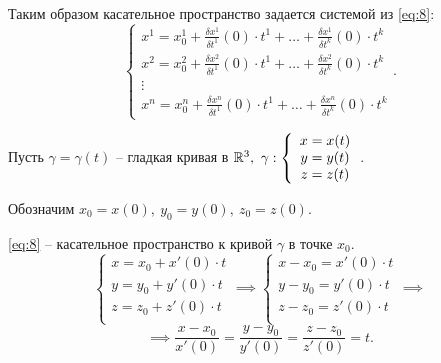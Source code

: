 \begin{definition}
    Таким образом касательное пространство задается системой из \ref{eq:8}:
    \[
        \left\{\begin{array}{l}
            x^1 = x^1_0 + \frac{\delta x^1}{\delta t^1} (0)\cdot t^1 + \ldots + \frac{\delta x^1}{\delta t^k}(0)\cdot t^k \\
            x^2 = x^2_0 + \frac{\delta x^2}{\delta t^1} (0)\cdot t^1 + \ldots + \frac{\delta x^2}{\delta t^k}(0)\cdot t^k \\
            \vdots                                                                                                        \\
            x^n = x^n_0 + \frac{\delta x^n}{\delta t^1} (0)\cdot t^1 + \ldots + \frac{\delta x^n}{\delta t^k}(0)\cdot t^k
        \end{array}\right..
    \]
\end{definition}

\begin{example}
    Пусть $\gamma = \gamma (t)$ -- гладкая кривая в $\R^3, \ \gamma:\left\{\begin{array}{c}
            x = x(t) \\
            y = y(t) \\
            z = z(t)
        \end{array}\right.$.

    Обозначим $x_0 = x(0), \ y_0 = y(0), \ z_0 = z(0)$.

    \ref{eq:8} -- касательное пространство к кривой $\gamma$ в точке $x_0$.
    \[
        \left\{\begin{array}{l}
            x = x_0 + x'(0) \cdot t \\
            y = y_0 + y'(0) \cdot t \\
            z = z_0 + z'(0) \cdot t \\
        \end{array}\right. \implies \left\{\begin{array}{l}
            x - x_0 = x'(0)\cdot t \\
            y - y_0 = y'(0)\cdot t \\
            z - z_0 = z'(0)\cdot t \\
        \end{array}\right. \implies
    \]
    \[
        \implies \frac{x - x_0}{x'(0)} = \frac{y - y_0}{y'(0)} = \frac{z - z_0}{z'(0)} = t.
    \]
\end{example}

